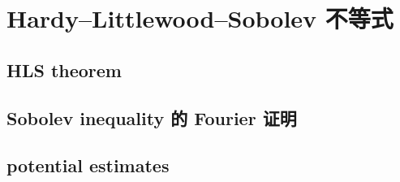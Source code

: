 \section{Hardy–Littlewood–Sobolev 不等式}
\label{b2:sec:1902}


\subsection{HLS theorem}
\label{b2:subsec:190201}

\subsection{Sobolev inequality 的 Fourier 证明}
\label{b2:subsec:190202}

\subsection{potential estimates}
\label{b2:subsec:190203}


